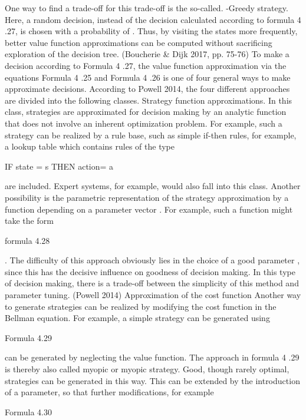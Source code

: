 One way to find a trade-off for this trade-off is the so-called. 
-Greedy strategy. Here, a random decision, instead of the decision calculated according to formula 4 .27, is chosen with a probability of . Thus, by visiting the states more frequently, better value function approximations can be computed without sacrificing exploration of the decision tree. (Boucherie & Dijk 2017, pp. 75-76)
To make a decision according to Formula 4 .27, the value function approximation via the equations Formula 4 .25 and Formula 4 .26 is one of four general ways to make approximate decisions. According to Powell 2014, the four different approaches are divided into the following classes. 
Strategy function approximations. 
In this class, strategies are approximated for decision making by an analytic function that does not involve an inherent optimization problem. For example, such a strategy can be realized by a rule base, such as simple if-then rules, for example, a lookup table which contains rules of the type 

IF state = s THEN action= a

are included. Expert systems, for example, would also fall into this class. Another possibility is the parametric representation of the strategy approximation by a function depending on a parameter vector . For example, such a function might take the form



formula 4.28

. The difficulty of this approach obviously lies in the choice of a good parameter , since this has the decisive influence on goodness of decision making. In this type of decision making, there is a trade-off between the simplicity of this method and parameter tuning. (Powell 2014)
Approximation of the cost function 
Another way to generate strategies can be realized by modifying the cost function in the Bellman equation. For example, a simple strategy can be generated using



Formula 4.29

can be generated by neglecting the value function. The approach in formula 4 .29 is thereby also called myopic or myopic strategy. Good, though rarely optimal, strategies can be generated in this way. This can be extended by the introduction of a parameter, so that further modifications, for example



Formula 4.30

